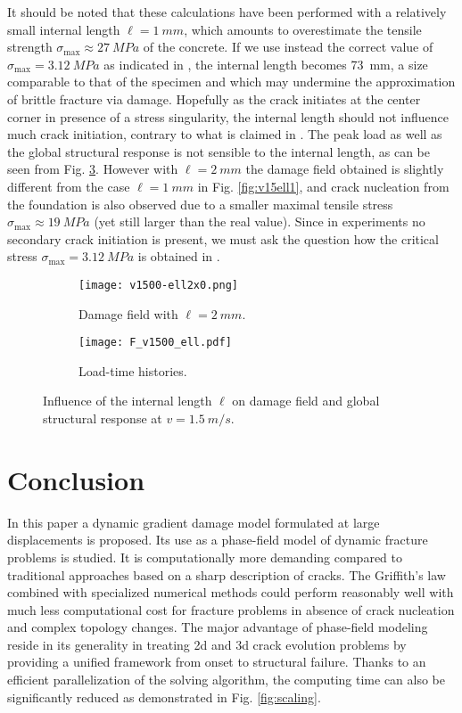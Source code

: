 It should be noted that these calculations have been performed with a relatively small internal length $\ell=\SI{1}{mm}$, which amounts to overestimate the tensile strength $\sigma_\mathrm{max}\approx \SI{27}{MPa}$ of the concrete. If we use instead the correct value of $\sigma_\mathrm{max}=\SI{3.12}{MPa}$ as indicated in \cite{OzboltBedeSharmaMayer:2015}, the internal length becomes \SI{73}{mm}, a size comparable to that of the specimen and which may undermine the approximation of brittle fracture via damage. Hopefully as the crack initiates at the center corner in presence of a stress singularity, the internal length should not influence much crack initiation, contrary to what is claimed in \cite{MesgarnejadBourdinKhonsari:2014}. The peak load as well as the global structural response is not sensible to the internal length, as can be seen from Fig. \ref{fig:alphav1500ell2x0F}. However with $\ell=\SI{2}{mm}$ the damage field obtained is slightly different from the case $\ell=\SI{1}{mm}$ in Fig. \ref{fig:v15ell1}, and crack nucleation from the foundation is also observed due to a smaller maximal tensile stress $\sigma_\mathrm{max}\approx \SI{19}{MPa}$ (yet still larger than the real value). Since in experiments no secondary crack initiation is present, we must ask the question how the critical stress $\sigma_\mathrm{max}=\SI{3.12}{MPa}$ is obtained in \cite{OzboltBedeSharmaMayer:2015}.
\begin{figure}[htbp]
\centering
\begin{subfigure}[b]{0.48\textwidth}
\centering
\texttt{[image: v1500-ell2x0.png]}
\caption{Damage field with $\ell=\SI{2}{mm}$.} \label{fig:alphav1500ell2x0}
\end{subfigure}
\begin{subfigure}[b]{0.48\textwidth}
\centering
\texttt{[image: F\_v1500\_ell.pdf]}
\caption{Load-time histories.} \label{fig:alphav1500ell2x0F}
\end{subfigure}
\caption{Influence of the internal length $\ell$ on damage field and global structural response at $v=\SI{1.5}{m/s}$.}
\end{figure}

\section{Conclusion} \label{sec:conclusion}
In this paper a dynamic gradient damage model formulated at large displacements is proposed. Its use as a phase-field model of dynamic fracture problems is studied. It is computationally more demanding compared to traditional approaches based on a sharp description of cracks. The Griffith's law combined with specialized numerical methods could perform reasonably well with much less computational cost for fracture problems in absence of crack nucleation and complex topology changes. The major advantage of phase-field modeling reside in its generality in treating 2d and 3d crack evolution problems by providing a unified framework from onset to structural failure. Thanks to an efficient parallelization of the solving algorithm, the computing time can also be significantly reduced as demonstrated in Fig. \ref{fig:scaling}. 

